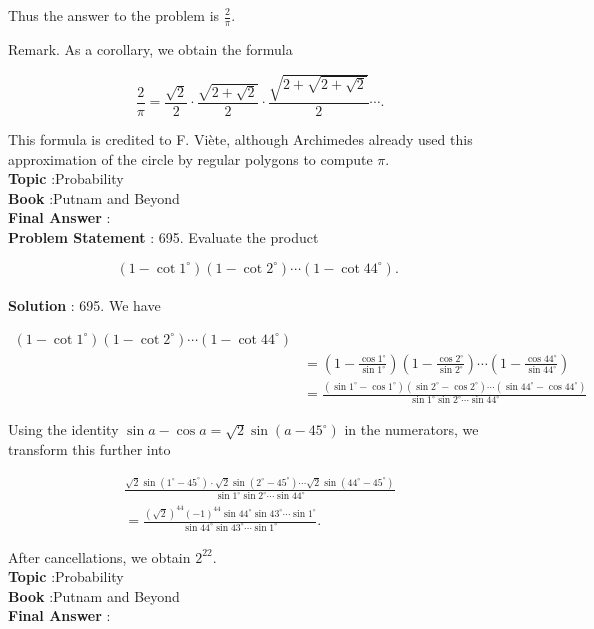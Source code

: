 \documentclass[10pt]{article}
\begin{document}
Thus the answer to the problem is $\frac{2}{\pi}$.

Remark. As a corollary, we obtain the formula

$$
\frac{2}{\pi}=\frac{\sqrt{2}}{2} \cdot \frac{\sqrt{2+\sqrt{2}}}{2} \cdot \frac{\sqrt{2+\sqrt{2+\sqrt{2}}}}{2} \cdots .
$$

This formula is credited to F. Viète, although Archimedes already used this approximation of the circle by regular polygons to compute $\pi$.
\\
\textbf{Topic} :Probability\\
\textbf{Book} :Putnam and Beyond\\
\textbf{Final Answer} :\\


\textbf{Problem Statement} :
695. Evaluate the product

$$
\left(1-\cot 1^{\circ}\right)\left(1-\cot 2^{\circ}\right) \cdots\left(1-\cot 44^{\circ}\right) \text {. }
$$
\\
\textbf{Solution} :
695. We have

$$
\begin{aligned}
\left(1-\cot 1^{\circ}\right)\left(1-\cot 2^{\circ}\right) \cdots\left(1-\cot 44^{\circ}\right) \\
&=\left(1-\frac{\cos 1^{\circ}}{\sin 1^{\circ}}\right)\left(1-\frac{\cos 2^{\circ}}{\sin 2^{\circ}}\right) \cdots\left(1-\frac{\cos 44^{\circ}}{\sin 44^{\circ}}\right) \\
&=\frac{\left(\sin 1^{\circ}-\cos 1^{\circ}\right)\left(\sin 2^{\circ}-\cos 2^{\circ}\right) \cdots\left(\sin 44^{\circ}-\cos 44^{\circ}\right)}{\sin 1^{\circ} \sin 2^{\circ} \cdots \sin 44^{\circ}}
\end{aligned}
$$

Using the identity $\sin a-\cos a=\sqrt{2} \sin \left(a-45^{\circ}\right)$ in the numerators, we transform this further into

$$
\begin{gathered}
\frac{\sqrt{2} \sin \left(1^{\circ}-45^{\circ}\right) \cdot \sqrt{2} \sin \left(2^{\circ}-45^{\circ}\right) \cdots \sqrt{2} \sin \left(44^{\circ}-45^{\circ}\right)}{\sin 1^{\circ} \sin 2^{\circ} \cdots \sin 44^{\circ}} \\
=\frac{(\sqrt{2})^{44}(-1)^{44} \sin 44^{\circ} \sin 43^{\circ} \cdots \sin 1^{\circ}}{\sin 44^{\circ} \sin 43^{\circ} \cdots \sin 1^{\circ}} .
\end{gathered}
$$

After cancellations, we obtain $2^{22}$.
\\
\textbf{Topic} :Probability\\
\textbf{Book} :Putnam and Beyond\\
\textbf{Final Answer} :\\
\end{document}
